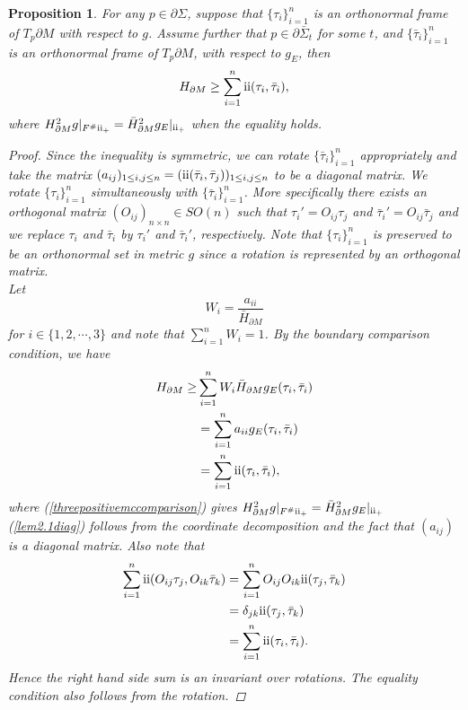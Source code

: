 \documentclass[11pt,letterpaper]{amsart}
\newcommand{\RN}[1]{%
  \textup{\uppercase\expandafter{\romannumeral#1}}%
}
\newtheorem{prop}{Proposition}[section]
\begin{document}
\begin{prop}\label{prop:local estimates}
For any $p\in \partial\Sigma$, suppose that $\{\tau_i\}_{i=1}^n$ is an orthonormal frame of $T_p \partial M$ with respect to $g$. Assume further that $p\in\partial\bar{\Sigma}_t$ for some $t$, and $\{\bar{\tau}_i\}_{i=1}^n$ is an orthonormal frame of $T_p \partial M$, with respect to $g_E$, then
\begin{align}\label{eq: local estimate}
    H_{\partial M}\geq \sum_{i=1}^n\RN{2}(\tau_i,\bar{\tau}_i),
\end{align}
where $H_{\partial M}^{2} g|_{F^{\#}\RN{2}_{+}} = \bar{H}_{\partial M}^{2} g_{E}|_{\RN{2}_{+}}$ when the equality holds. 

\begin{proof}
   Since the inequality is symmetric, we can rotate $\{\bar{\tau}_i\}_{i=1}^n$ appropriately and take the matrix $(a_{ij})_{1 \le i,j \le n} = (\RN{2}(\bar{\tau}_i,\bar{\tau}_j))_{1 \le i,j \le n}$ to be a diagonal matrix. We rotate $\{\tau_i\}_{i=1}^n$ simultaneously with $\{\bar{\tau}_i\}_{i=1}^n$. More specifically there exists an orthogonal matrix $(O_{ij})_{n\times n}\in SO(n)$ such that $\tau_{i}' = O_{ij}\tau_{j}$ and $\bar{\tau}_{i}' = O_{ij} \bar{\tau}_{j}$ and we replace $\tau_{i}$ and $\bar{\tau}_{i}$ by $\tau_{i}'$ and $\bar{\tau}_{i}'$, respectively. Note that $\{\tau_i\}_{i=1}^n$ is preserved to be an orthonormal set in metric $g$ since a rotation is represented by an orthogonal matrix.
 \\
        Let
    \[
    W_i=\frac{a_{ii}}{\bar{H}_{\partial M}}
    \]
    for $i\in\{1,2,\cdots,3\}$ and note that $\sum_{i=1}^nW_i=1$. By the boundary comparison condition, we have
\begin{align}
  \label{threepositivemccomparison} H_{\partial M}\geq& \sum_{i=1}^nW_i\bar{H}_{\partial M} g_E(\tau_i,\bar{\tau}_{i}) \\
  \nonumber &= \sum_{i=1}^na_{ii} g_E(\tau_i,\bar{\tau}_{i})\\
    &=\sum_{i=1}^n\RN{2}(\tau_i,\bar{\tau}_i) \label{lem2.1diag},
    \end{align}
where (\ref{threepositivemccomparison}) gives $H_{\partial M}^{2} g|_{F^{\#}\RN{2}_{+}} = \bar{H}_{\partial M}^{2} g_{E}|_{\RN{2}_{+}}$ (\ref{lem2.1diag}) follows from the coordinate decomposition and the fact that $(a_{ij})$ is a diagonal matrix.
Also note that
\begin{align*}
    \sum_{i=1}^n\RN{2}(O_{ij}\tau_j,O_{ik}\bar{\tau}_k)&= \sum_{i=1}^nO_{ij}O_{ik}\RN{2}(\tau_j,\bar{\tau}_k) \\ &= \delta_{jk} \RN{2}(\tau_j,\bar{\tau}_k) \\ &= \sum_{i=1}^n\RN{2}(\tau_i,\bar{\tau}_i).
\end{align*}
Hence the right hand side sum is an invariant over rotations. The equality condition also follows from the rotation.
\end{proof}

\end{prop}
\end{document}
